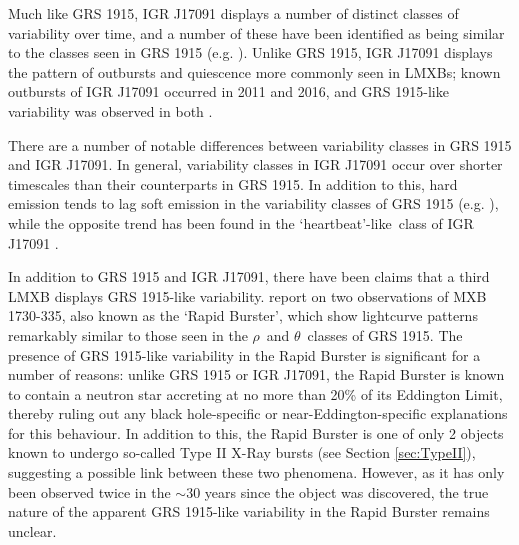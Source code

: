 \par Much like GRS 1915, IGR J17091 displays a number of distinct classes of variability over time, and a number of these have been identified as being similar to the classes seen in GRS 1915 (e.g. \citealp{Altamirano_IGR_FH,Zhang_IGR}).  Unlike GRS 1915, IGR J17091 displays the pattern of outbursts and quiescence more commonly seen in LMXBs; known outbursts of IGR J17091 occurred in 2011 and 2016, and GRS 1915-like variability was observed in both \citep{Reynolds_2016HB}.
\par There are a number of notable differences between variability classes in GRS 1915 and IGR J17091.  In general, variability classes in IGR J17091 occur over shorter timescales than their counterparts in GRS 1915.  In addition to this, hard emission tends to lag soft emission in the variability classes of GRS 1915 (e.g. \citealp{Janiuk_Lag}), while the opposite trend has been found in the `heartbeat'-like\indexrho\ class of IGR J17091 \citep{Altamirano_IGR_FH}.
\par In addition to GRS 1915 and IGR J17091, there have been claims that a third LMXB displays GRS 1915-like variability.  \citet{Bagnoli_RB} report on two observations of MXB 1730-335, also known as the `Rapid Burster', which show lightcurve patterns remarkably similar to those seen in the $\rho$\indexrho\ and $\theta$\indextheta\ classes of GRS 1915.  The presence of GRS 1915-like variability in the Rapid Burster is significant for a number of reasons: unlike GRS 1915 or IGR J17091, the Rapid Burster is known to contain a neutron star accreting at no more than 20\% of its Eddington Limit, thereby ruling out any black hole-specific or near-Eddington-specific explanations for this behaviour.  In addition to this, the Rapid Burster is one of only 2 objects known to undergo so-called Type II X-Ray bursts (see Section \ref{sec:TypeII}), suggesting a possible link between these two phenomena.  However, as it has only been observed twice in the $\sim30$ years since the object was discovered, the true nature of the apparent GRS 1915-like variability in the Rapid Burster remains unclear.

